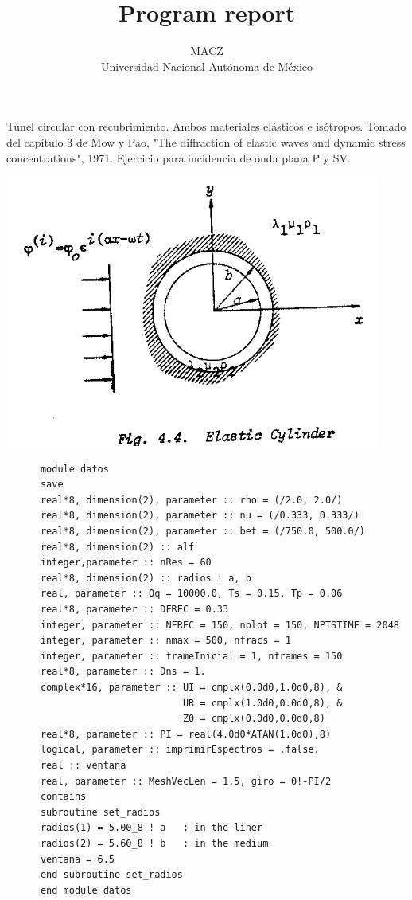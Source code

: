\documentclass [11pt,spanish]{article}
\begin{document}
\title {Program report}
\author {MACZ\\
Universidad Nacional Aut\'onoma de M\'exico}
\maketitle 

\graphicspath{{./fig/}}

Túnel circular con recubrimiento. Ambos materiales elásticos e isótropos. Tomado del capítulo 3 de Mow y Pao, "The diffraction of elastic waves and dynamic stress concentrations", 1971. 
Ejercicio para incidencia de onda plana P y SV.

\includegraphics[scale=0.5]{figura}
\begingroup
\fontsize{10pt}{12pt}
\selectfont
{}
\begin{shaded}
\begin{verbatim}
      module datos
      save
      real*8, dimension(2), parameter :: rho = (/2.0, 2.0/)
      real*8, dimension(2), parameter :: nu = (/0.333, 0.333/)
      real*8, dimension(2), parameter :: bet = (/750.0, 500.0/)
      real*8, dimension(2) :: alf
      integer,parameter :: nRes = 60
      real*8, dimension(2) :: radios ! a, b 
      real, parameter :: Qq = 10000.0, Ts = 0.15, Tp = 0.06
      real*8, parameter :: DFREC = 0.33
      integer, parameter :: NFREC = 150, nplot = 150, NPTSTIME = 2048
      integer, parameter :: nmax = 500, nfracs = 1
      integer, parameter :: frameInicial = 1, nframes = 150
      real*8, parameter :: Dns = 1.
      complex*16, parameter :: UI = cmplx(0.0d0,1.0d0,8), &
                               UR = cmplx(1.0d0,0.0d0,8), &
                               Z0 = cmplx(0.0d0,0.0d0,8)
      real*8, parameter :: PI = real(4.0d0*ATAN(1.0d0),8)
      logical, parameter :: imprimirEspectros = .false.
      real :: ventana
      real, parameter :: MeshVecLen = 1.5, giro = 0!-PI/2
      contains
      subroutine set_radios
      radios(1) = 5.00_8 ! a   : in the liner
      radios(2) = 5.60_8 ! b   : in the medium
      ventana = 6.5
      end subroutine set_radios
      end module datos
\end{verbatim}
\end{shaded}
\endgroup
\end{document}
